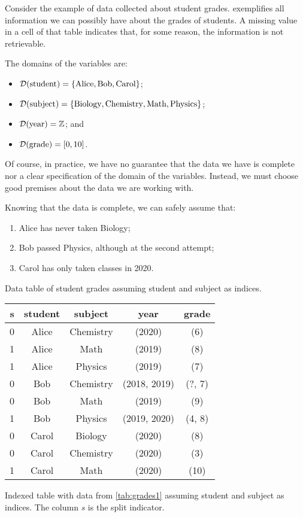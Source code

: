 Consider the example of data collected about student grades.  
exemplifies all information we can possibly have about the grades of students.  A missing
value in a cell of that table indicates that, for some reason, the information is not
retrievable.

The domains of the variables are:
\begin{itemize}
  \itemsep0em
  \item $\mathcal{D}\!\left(\text{student}\right) = \left\{\text{Alice}, \text{Bob}, \text{Carol}\right\}$;
  \item $\mathcal{D}\!\left(\text{subject}\right) = \left\{\text{Biology}, \text{Chemistry}, \text{Math},
    \text{Physics}\right\}$;
  \item $\mathcal{D}\!\left(\text{year}\right) = \mathbb{Z}$; and
  \item $\mathcal{D}\!\left(\text{grade}\right) = \left[0, 10\right]$.
\end{itemize}

Of course, in practice, we have no guarantee that the data we have is complete nor a
clear specification of the domain of the variables.  Instead, we must choose good
premises about the data we are working with.

Knowing that the data is complete, we can safely assume that:
\begin{enumerate}
  \itemsep0em
  \item Alice has never taken Biology;
  \item Bob passed Physics, although at the second attempt;
  \item Carol has only taken classes in 2020.
\end{enumerate}

\begin{tablebox}[label=tab:grades2]{Data table of student grades assuming student and subject as indices.}
  \centering
  \begin{tabular}{ccccc}
    \toprule
    \textbf{s} & \textbf{student} & \textbf{subject} & \textbf{year} & \textbf{grade} \\
    \midrule
    0 & Alice & Chemistry & (2020) & (6) \\
    1 & Alice & Math & (2019) & (8) \\
    1 & Alice & Physics & (2019) & (7) \\
    0 & Bob & Chemistry & (2018, 2019) & (?, 7) \\
    0 & Bob & Math & (2019) & (9) \\
    1 & Bob & Physics & (2019, 2020) & (4, 8) \\
    0 & Carol & Biology & (2020) & (8) \\
    0 & Carol & Chemistry & (2020) & (3) \\
    1 & Carol & Math & (2020) & (10) \\
    \bottomrule
  \end{tabular}
  \tcblower
  Indexed table with data from \cref{tab:grades1} assuming student and
  subject as indices.  The column $s$ is the split indicator.
\end{tablebox}

